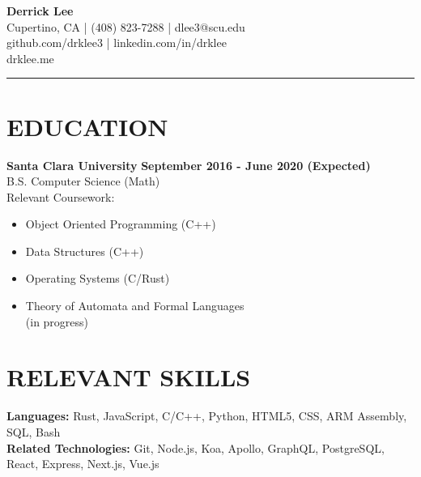 \documentclass{res}
\begin{document}
	\thispagestyle{empty} %
	\begin{multicols}{2}
		\vfill\null
		{\bf \huge{Derrick Lee}} \\
		
		\hspace*{\fill} {Cupertino, CA | (408) 823-7288 | dlee3@scu.edu} \\
		\hspace*{\fill} {github.com/drklee3 | linkedin.com/in/drklee} \\
		\hspace*{\fill} {drklee.me} \\
	\end{multicols}
	\vspace{-10mm}
	\noindent\rule{\textwidth}{1pt}
	
	\begin{resume}

		\section{EDUCATION}

		{\bf Santa Clara University} \hfill {\bf September 2016 - June 2020 (Expected)} \\
			B.S. Computer Science (Math) \\
			Relevant Coursework:
			\vspace{-3.5mm}
			\begin{multicols}{2}
			\begin{itemize} \itemsep -2pt
				\item Object Oriented Programming (C++)
				\item Data Structures (C++)
				\item Operating Systems (C/Rust)
				\item Theory of Automata and Formal Languages \\
				(in progress)
			\end{itemize}
			\end{multicols}
		
		\section{RELEVANT SKILLS}
		\vspace{6pt}

			{\bf Languages:} Rust, JavaScript, C/C++, Python, HTML5, CSS, ARM Assembly, SQL, Bash \\
			{\bf Related Technologies:} Git, Node.js, Koa, Apollo, GraphQL, PostgreSQL, React, Express, Next.js, Vue.js
		

\end{resume}
\end{document}
